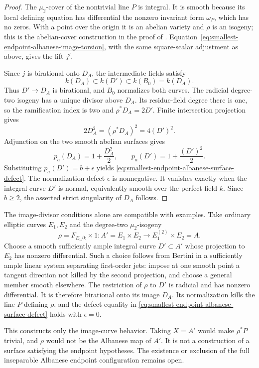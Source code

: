\begin{proof}
The $\mu_2$-cover of the nontrivial line $P$ is integral.
It is smooth because its local defining equation has differential
the nonzero invariant form $\omega_P$, which has no zeros.
With a point over the origin it is an abelian variety and
$\rho$ is an isogeny; this is the abelian-cover construction in
the proof of \cite[Lemma~1.3, p.~195]{MehtaSrinivasAlbanese}.
Equation~\eqref{eq:smallest-endpoint-albanese-image-torsion},
with the same square-scalar adjustment as above, gives the lift
$j'$.

Since $j$ is birational onto $D_A$, the intermediate fields satisfy
\[
 k(D_A)\subset k(D')\subset k(B_0)=k(D_A).
\]
Thus $D'\to D_A$ is birational, and $B_0$ normalizes both curves.
The radicial degree-two isogeny has a unique divisor above $D_A$.
Its residue-field degree there is one, so the ramification index
is two and $\rho^*D_A=2D'$.
Finite intersection projection gives
\[
 2D_A^2=(\rho^*D_A)^2=4(D')^2.
\]
Adjunction on the two smooth abelian surfaces gives
\[
 p_a(D_A)=1+\frac{D_A^2}{2},\qquad
 p_a(D')=1+\frac{(D')^2}{2}.
\]
Substituting $p_a(D')=b+\epsilon$ yields
\eqref{eq:smallest-endpoint-albanese-surface-defect}.
The normalization defect $\epsilon$ is nonnegative.
It vanishes exactly when the integral curve $D'$ is normal,
equivalently smooth over the perfect field $k$.
Since $b\ge2$, the asserted strict singularity of $D_A$ follows.
\end{proof}

\begin{remark}
\label{rem:smallest-endpoint-albanese-image-pattern}
The image-divisor conditions alone are compatible with examples.
Take ordinary elliptic curves $E_1,E_2$ and the degree-two
$\mu_2$-isogeny
\[
 \rho=F_{E_1/k}\times1:
 A'=E_1\times E_2\longrightarrow E_1^{(2)}\times E_2=A.
\]
Choose a smooth sufficiently ample integral curve $D'\subset A'$
whose projection to $E_2$ has nonzero differential.
Such a choice follows from Bertini in a sufficiently ample linear
system separating first-order jets: impose at one smooth point
a tangent direction not killed by the second projection, and
choose a general member smooth elsewhere.
The restriction of $\rho$ to $D'$ is radicial and has nonzero
differential.  It is therefore birational onto its image $D_A$.
Its normalization kills the line $P$ defining $\rho$, and the
defect equality in
\eqref{eq:smallest-endpoint-albanese-surface-defect} holds with
$\epsilon=0$.

This constructs only the image-curve behavior.
Taking $X=A'$ would make $\rho^*P$ trivial, and $\rho$ would not be
the Albanese map of $A'$.
It is not a construction of a surface satisfying the endpoint
hypotheses.  The existence or exclusion of the full inseparable
Albanese endpoint configuration remains open.
\end{remark}
